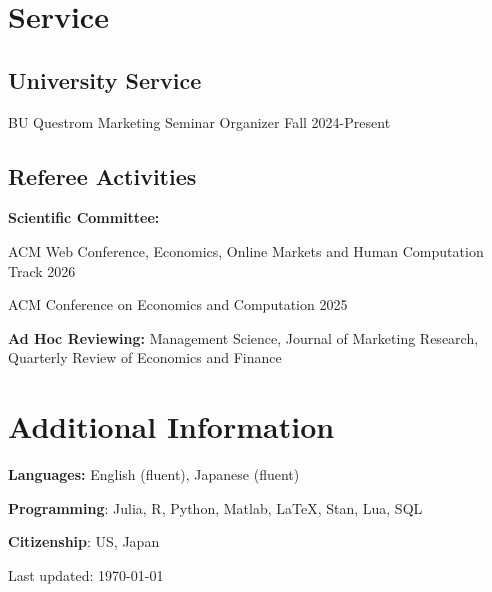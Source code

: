 \documentclass[letterpaper]{article}
\def\footerlink{}
\renewenvironment{itemize}{
  \begin{list}{}{
    \setlength{\leftmargin}{1.5em}
  }
}{
  \end{list}
}
\begin{document}
\section*{Service}
\subsection*{University Service}
\begin{itemize}
\item BU Questrom Marketing Seminar Organizer \hfill Fall 2024-Present
\end{itemize}

\subsection*{Referee Activities}
\begin{itemize}
\item \textbf{Scientific Committee:}
  \begin{itemize}
  \item ACM Web Conference, Economics, Online Markets and Human Computation Track  \hfill 2026 
  \item ACM Conference on Economics and Computation \hfill 2025 
  \end{itemize}
\item \textbf{Ad Hoc Reviewing:} Management Science, Journal of Marketing Research, Quarterly Review of Economics and Finance 
\end{itemize}

\section*{Additional Information}
\begin{itemize}
\item \textbf{Languages:} English (fluent), Japanese (fluent)
\item \textbf{Programming}: Julia, R, Python, Matlab, \LaTeX, Stan, Lua, SQL
\item \textbf{Citizenship}: US, Japan
\end{itemize}


\vfill

\begin{center}
  \begin{footnotesize}
    Last updated: \today \\
    \href{\footerlink}{\texttt{\footerlink}}
  \end{footnotesize}
\end{center}
\end{document}

